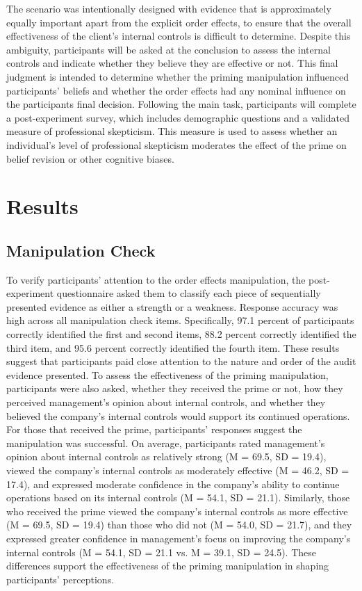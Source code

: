 \documentclass[12pt,english]{article}
\begin{document}
The scenario was intentionally designed with evidence that is approximately equally important apart from the explicit order effects, to ensure that the overall effectiveness of the client’s internal controls is difficult to determine. Despite this ambiguity, participants will be asked at the conclusion to assess the internal controls and indicate whether they believe they are effective or not. This final judgment is intended to determine whether the priming manipulation influenced participants’ beliefs and whether the order effects had any nominal influence on the participants final decision. Following the main task, participants will complete a post-experiment survey, which includes demographic questions and a validated measure of professional skepticism. This measure is used to assess whether an individual’s level of professional skepticism moderates the effect of the prime on belief revision or other cognitive biases.

\section{Results}
\subsection{Manipulation Check}
To verify participants’ attention to the order effects manipulation, the post-experiment questionnaire asked them to classify each piece of sequentially presented evidence as either a strength or a weakness. Response accuracy was high across all manipulation check items. Specifically, 97.1 percent of participants correctly identified the first and second items, 88.2 percent correctly identified the third item, and 95.6 percent correctly identified the fourth item. These results suggest that participants paid close attention to the nature and order of the audit evidence presented. To assess the effectiveness of the priming manipulation, participants were also asked, whether they received the prime or not, how they perceived management’s opinion about internal controls, and whether they believed the company’s internal controls would support its continued operations. For those that received the prime, participants’ responses suggest the manipulation was successful. On average, participants rated management’s opinion about internal controls as relatively strong (M = 69.5, SD = 19.4), viewed the company’s internal controls as moderately effective (M = 46.2, SD = 17.4), and expressed moderate confidence in the company’s ability to continue operations based on its internal controls (M = 54.1, SD = 21.1). Similarly, those who received the prime viewed the company’s internal controls as more effective (M = 69.5, SD = 19.4) than those who did not (M = 54.0, SD = 21.7), and they expressed greater confidence in management’s focus on improving the company’s internal controls (M = 54.1, SD = 21.1 vs. M = 39.1, SD = 24.5). These differences support the effectiveness of the priming manipulation in shaping participants’ perceptions.
\end{document}

